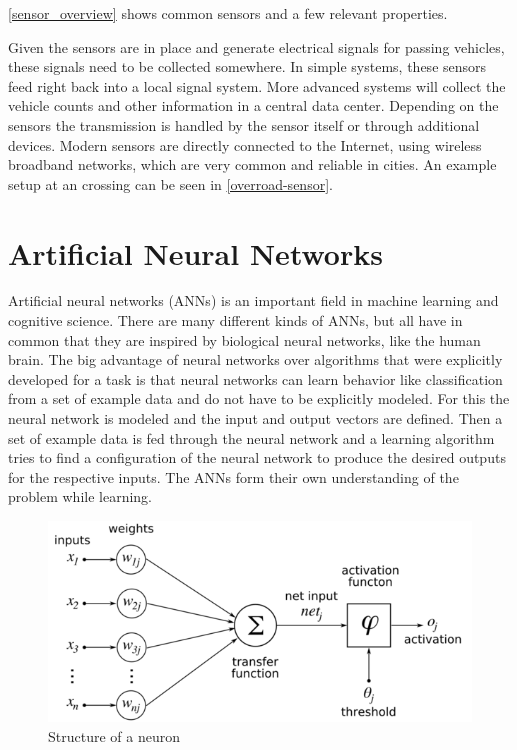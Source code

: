\autoref{sensor_overview} shows common sensors and a few relevant properties.

Given the sensors are in place and generate electrical signals for passing vehicles, these signals need to be collected somewhere. In simple systems, these sensors feed right back into a local signal system. More advanced systems will collect the vehicle counts and other information in a central data center. Depending on the sensors the transmission is handled by the sensor itself or through additional devices. Modern sensors are directly connected to the Internet, using wireless broadband networks, which are very common and reliable in cities. An example setup at an crossing can be seen in \autoref{overroad-sensor}.

\section{Artificial Neural Networks}
\label{sec:ann}

Artificial neural networks (ANNs) is an important field in machine learning and cognitive science. There are many different kinds of ANNs, but all have in common that they are inspired by biological neural networks, like the human brain. The big advantage of neural networks over algorithms that were explicitly developed for a task is that neural networks can learn behavior like classification from a set of example data and do not have to be explicitly modeled. For this the neural network is modeled and the input and output vectors are defined. Then a set of example data is fed through the neural network and a learning algorithm tries to find a configuration of the neural network to produce the desired outputs for the respective inputs. The ANNs form their own understanding of the problem while learning.

\begin{figure}[ht]
	\centering
  \includegraphics[width=15cm]{figures/neuron_structure}
	\caption[Structure of a neuron]{Structure of a neuron \protect\footnotemark}
	\label{neuron}
\end{figure}


